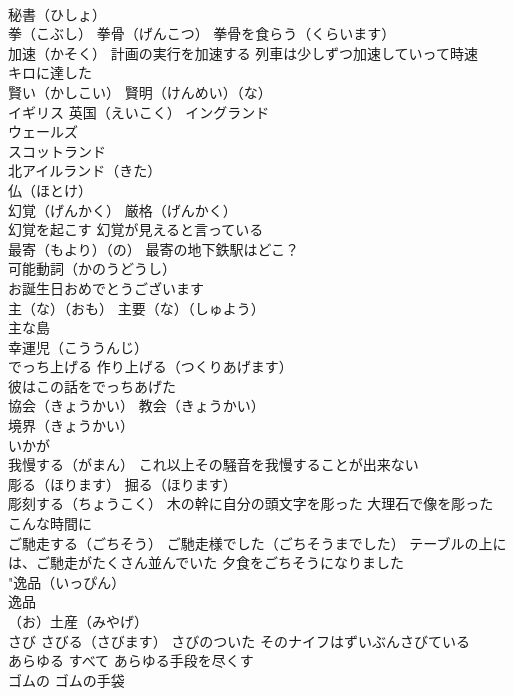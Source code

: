 \documentclass[8pt]{extreport}
\begin{document}
\begin{CJK}{UTF8}{min}
\\	秘書（ひしょ）
\\	拳（こぶし） 拳骨（げんこつ） 拳骨を食らう（くらいます）
\\	加速（かそく） 計画の実行を加速する 列車は少しずつ加速していって時速 
\\	キロに達した
\\	賢い（かしこい） 賢明（けんめい）（な）
\\	イギリス 英国（えいこく） イングランド 
\\	ウェールズ 
\\	スコットランド 
\\	北アイルランド（きた） 
\\	仏（ほとけ）
\\	幻覚（げんかく） 厳格（げんかく）
\\	幻覚を起こす 幻覚が見えると言っている
\\	最寄（もより）（の） 最寄の地下鉄駅はどこ？
\\	可能動詞（かのうどうし）
\\	お誕生日おめでとうございます
\\	主（な）（おも） 主要（な）（しゅよう）
\\	主な島
\\	幸運児（こううんじ）
\\	でっち上げる 作り上げる（つくりあげます） 
\\	彼はこの話をでっちあげた
\\	協会（きょうかい） 教会（きょうかい）
\\	境界（きょうかい） 
\\	いかが
\\	我慢する（がまん） これ以上その騒音を我慢することが出来ない
\\	彫る（ほります） 掘る（ほります）
\\	彫刻する（ちょうこく） 木の幹に自分の頭文字を彫った 大理石で像を彫った
\\	こんな時間に
\\	ご馳走する（ごちそう） ご馳走様でした（ごちそうまでした） テーブルの上には、ご馳走がたくさん並んでいた 夕食をごちそうになりました
\\	"逸品（いっぴん） 
\\	逸品 
\\	（お）土産（みやげ）
\\	さび さびる（さびます） さびのついた そのナイフはずいぶんさびている
\\	あらゆる すべて あらゆる手段を尽くす
\\	ゴムの ゴムの手袋

\end{CJK}
\end{document}
